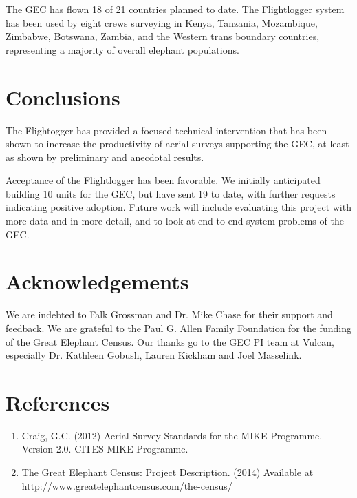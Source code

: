 \documentclass{sig-alternate-2013}
\begin{document}
The GEC has flown 18 of 21 countries planned to date. The Flightlogger system has been used by eight crews surveying in Kenya, Tanzania, Mozambique, Zimbabwe, Botswana, Zambia, and the Western trans boundary countries, representing a majority of overall elephant populations. 

\section{Conclusions}
The Flightogger has provided a focused technical intervention that has been shown to increase the productivity of aerial surveys supporting the GEC, at least as shown by preliminary and anecdotal results. 

Acceptance of the Flightlogger has been favorable. We initially anticipated building 10 units for the GEC, but have sent 19 to date, with further requests indicating positive adoption. 
Future work will include evaluating this project with more data and in more detail, and to look at end to end system problems of the GEC.

\section{Acknowledgements}
We are indebted to Falk Grossman and Dr. Mike Chase
for their support and feedback. We are grateful to the Paul G. Allen Family Foundation for the funding
of the Great Elephant Census. Our thanks go to the GEC PI team at Vulcan, especially Dr. Kathleen Gobush, Lauren Kickham and Joel Masselink.

\section{References}
\begin{enumerate}
  \item Craig, G.C. (2012) Aerial Survey Standards for the MIKE Programme. Version 2.0.  CITES MIKE Programme.
  \item The Great Elephant Census:  Project Description. (2014)  Available at http://www.greatelephantcensus.com/the-census/
\end{enumerate}
\end{document}
